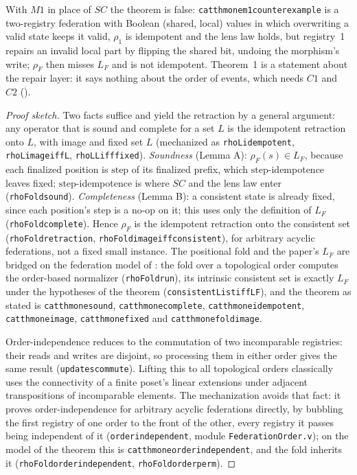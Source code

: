 \documentclass[11pt,a4paper]{article}
\theoremstyle{plain}
\theoremstyle{definition}
\theoremstyle{remark}
\renewcommand{\_}{\origunderscore\allowbreak}
\begin{document}
With $M1$ in place of $SC$ the theorem is false: \texttt{cat\_thm\_one\_m1\_counterexample} is a
two-registry federation with Boolean (shared, local) values in which overwriting a valid state keeps
it valid, $\rho_1$ is idempotent and the lens law holds, but registry~1 repairs an invalid local part
by flipping the shared bit, undoing the morphism's write; $\rho_F$ then misses $L_F$ and is not
idempotent. Theorem~1 is a statement about the repair layer: it says nothing about the order of
events, which needs $C1$ and $C2$ ().
\begin{proof}[Proof sketch]
Two facts suffice and yield the retraction by a general argument: any operator that is sound and
complete for a set $L$ is the idempotent retraction onto $L$, with image and fixed set $L$
(mechanized as \texttt{rhoL\_idempotent}, \texttt{rhoL\_image\_iff\_L}, \texttt{rhoL\_L\_iff\_fixed}).
\emph{Soundness} (Lemma A): $\rho_F(s) \in L_F$, because each finalized position is $\mathrm{step}$ of
its finalized prefix, which $\mathrm{step}$-idempotence leaves fixed; $\mathrm{step}$-idempotence is
where $SC$ and the lens law enter (\texttt{rhoFold\_sound}). \emph{Completeness} (Lemma B): a
consistent state is already fixed, since each position's step is a no-op on it; this uses only the
definition of $L_F$ (\texttt{rhoFold\_complete}). Hence $\rho_F$ is the idempotent retraction onto the
consistent set (\texttt{rhoFold\_retraction}, \texttt{rhoFold\_image\_iff\_consistent}), for
arbitrary acyclic federations, not a fixed small instance. The positional fold and the paper's $L_F$
are bridged on the federation model of : the fold over a topological order computes the
order-based normalizer (\texttt{rhoFold\_run}), its intrinsic consistent set is exactly $L_F$ under
the hypotheses of the theorem (\texttt{consistentList\_iff\_LF}), and the theorem as stated is
\texttt{cat\_thm\_one\_sound}, \texttt{cat\_thm\_one\_complete}, \texttt{cat\_thm\_one\_idempotent},
\texttt{cat\_thm\_one\_image}, \texttt{cat\_thm\_one\_fixed} and \texttt{cat\_thm\_one\_fold\_image}.

Order-independence reduces to the commutation of two incomparable registries: their reads and writes
are disjoint, so processing them in either order gives the same result (\texttt{updates\_commute}).
Lifting this to all topological orders classically uses the connectivity of a finite poset's linear
extensions under adjacent transpositions of incomparable elements. The mechanization avoids that fact:
it proves order-independence for arbitrary acyclic federations directly, by bubbling the first
registry of one order to the front of the other, every registry it passes being independent of it
(\texttt{order\_independent}, module \texttt{FederationOrder.v}); on the model of the theorem this is
\texttt{cat\_thm\_one\_order\_independent}, and the fold inherits it
(\texttt{rhoFold\_order\_independent}, \texttt{rhoFold\_order\_perm}).
\end{proof}
\end{document}
